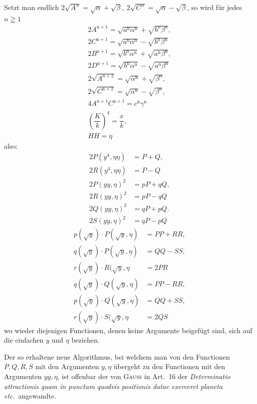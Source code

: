 Setzt man endlich $2\surd {A''}=\surd \alpha+\surd \beta,\allowbreak \ 2\surd {C''}=\surd \alpha-\surd \beta$, so wird für jedes $n\geqq1$
\[
\begin{gathered}
2A^{\mathrm n+1}=\surd {a^{\mathrm n}\alpha^{\mathrm n}}+\surd {b^{\mathrm n}\beta^{\mathrm n}},\\[7pt]
2C^{\mathrm n+1}=\surd {a^{\mathrm n}\alpha^{\mathrm n}}-\surd {b^{\mathrm n}\beta^{\mathrm n}}\\[7pt]
2B^{\mathrm n+1}=\surd {b^{\mathrm n}\alpha^{\mathrm n}}+\surd {a^{\mathrm n}\beta^{\mathrm n}},\\[7pt]
2D^{\mathrm n+1}=\surd {b^{\mathrm n}\alpha^{\mathrm n}}-\surd {a^{\mathrm n}\beta^{\mathrm n}}\\[7pt]
2\surd {A^{\mathrm n+2}}=\surd {\alpha^{\mathrm n}}+\surd {\beta^{\mathrm n}},\\[7pt]
2\surd {C^{\mathrm n+2}}=\surd {\alpha^{\mathrm n}}-\surd {\beta^{\mathrm n}},\\[7pt]
4A^{\mathrm n+1}C^{\mathrm n+1}=c^{\mathrm n}\gamma^{\mathrm n}\\[7pt]
\left(\dfrac Kk\right)^4=\dfrac{x}k,\\[7pt] HH=\eta
\end{gathered}
\]
also:
\[
\begin{aligned}
2P(y^4,\eta\eta)&=P+Q,\\[6pt]2R(y^4,\eta\eta)&=P-Q\\[6pt]
2P(yy,\eta)^2&=pP+qQ,\\[6pt]2R(yy,\eta)^2&=pP-qQ\\[6pt]
2Q(yy,\eta)^2&=qP+pQ.\\[6pt]2S(yy,\eta)^2&=qP-pQ
\end{aligned}
\]
\[
\begin{aligned}
p(\surd  y)\cdot P(\surd  y,\eta)&=PP+RR,\\[6pt]
q(\surd  y)\cdot P(\surd  y,\eta)&=QQ-SS,\\[6pt]
r(\surd  y)\cdot R(\surd  y,\eta&=2PR\\[6pt]
q(\surd  y)\cdot Q(\surd  y,\eta)&=PP-RR,\\[6pt]
p(\surd  y)\cdot Q(\surd  y,\eta)&=QQ+SS,\\[6pt]
r(\surd  y)\cdot S(\surd  y,\eta&=2QS
\end{aligned}
\]
wo wieder diejenigen Functionen, denen keine Argumente beigefügt sind, sich auf die einfachen $y$ und $\eta$ beziehen.

Der so erhaltene neue Algorithmus, bei welchem man von den Functionen $P,\allowbreak Q,\allowbreak R,\allowbreak S$ mit den Argumenten $y,\allowbreak \eta$ übergeht zu den Functionen mit den Argumenten $yy,\allowbreak \eta$, ist offenbar der von \textsc{Gauss} in Art.\ 16 der \textit{Determinatio attractionis quam in punctum quodvis positionis datae exerceret planeta etc.}\ angewandte.

